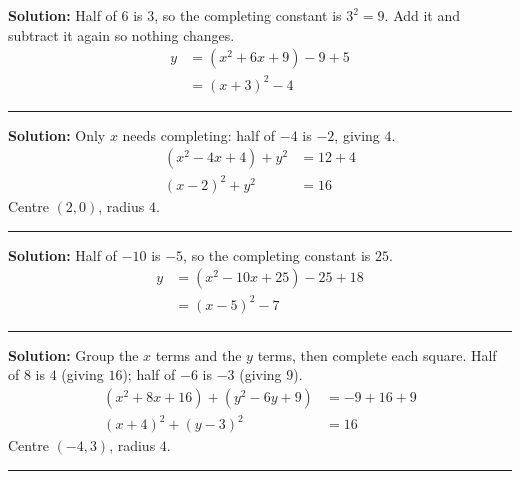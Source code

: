 \documentclass[12pt]{article}
\begin{document}




\textbf{Solution:} Half of $6$ is $3$, so the completing constant is $3^2 = 9$. Add it and
subtract it again so nothing changes.
\begin{align*}
  y &= (x^2 + 6x + 9) - 9 + 5 \\
    &= (x + 3)^2 - 4
\end{align*}

\vspace{0.2cm}\noindent\rule{\linewidth}{0.2pt}


\textbf{Solution:} Only $x$ needs completing: half of $-4$ is $-2$, giving $4$.
\begin{align*}
  (x^2 - 4x + 4) + y^2 &= 12 + 4 \\
  (x - 2)^2 + y^2 &= 16
\end{align*}
Centre $(2, 0)$, radius $4$. 

\vspace{0.2cm}\noindent\rule{\linewidth}{0.2pt}


\textbf{Solution:} Half of $-10$ is $-5$, so the completing constant is $25$.
\begin{align*}
  y &= (x^2 - 10x + 25) - 25 + 18 \\
    &= (x - 5)^2 - 7
\end{align*}

\vspace{0.2cm}\noindent\rule{\linewidth}{0.2pt}


\textbf{Solution:} Group the $x$ terms and the $y$ terms, then complete each square. Half of
$8$ is $4$ (giving $16$); half of $-6$ is $-3$ (giving $9$).
\begin{align*}
  (x^2 + 8x + 16) + (y^2 - 6y + 9) &= -9 + 16 + 9 \\
  (x + 4)^2 + (y - 3)^2 &= 16
\end{align*}
Centre $(-4, 3)$, radius $4$. 

\vspace{0.2cm}\noindent\rule{\linewidth}{0.2pt}
\end{document}
